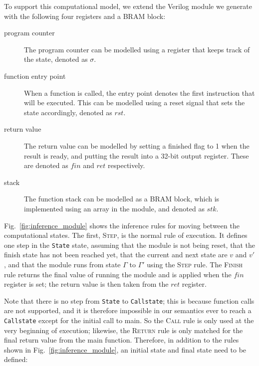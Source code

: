 To support this computational model, we extend the Verilog module we generate with the following four registers and a \gls{BRAM} block:

\begin{description}
  \item[program counter] The program counter can be modelled using a register that keeps track of the state, denoted as $\sigma$.
  \item[function entry point] When a function is called, the entry point denotes the first instruction that will be executed. This can be modelled using a reset signal that sets the state accordingly, denoted as $\mathit{rst}$.
  \item[return value] The return value can be modelled by setting a finished flag to 1 when the result is ready, and putting the result into a 32-bit output register. These are denoted as $\mathit{fin}$ and $\mathit{ret}$ respectively.
  \item[stack] The function stack can be modelled as a \gls{BRAM} block, which is implemented using an array in the module, and denoted as $\mathit{stk}$.
\end{description}

Fig.~\ref{fig:inference_module} shows the inference rules for moving between the computational states.  The first, \textsc{Step}, is the normal rule of execution.  It defines one step in the \texttt{State} state, assuming that the module is not being reset, that the finish state has not been reached yet, that the current and next state are $v$ and $v'$, and that the module runs from state $\Gamma$ to $\Gamma'$ using the \textsc{Step} rule.  The \textsc{Finish} rule returns the final value of running the module and is applied when the $\mathit{fin}$ register is set; the return value is then taken from the $\mathit{ret}$ register.

Note that there is no step from \texttt{State} to \texttt{Callstate}; this is because function calls are not supported, and it is therefore impossible in our semantics ever to reach a \texttt{Callstate} except for the initial call to main. So the \textsc{Call} rule is only used at the very beginning of execution; likewise, the \textsc{Return} rule is only matched for the final return value from the main function.
Therefore, in addition to the rules shown in Fig.~\ref{fig:inference_module}, an initial state and final state need to be defined:

